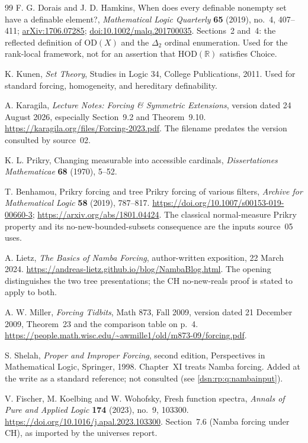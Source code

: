 \documentclass[11pt,a4paper]{article}
\numberwithin{equation}{section}
\theoremstyle{definition}
\theoremstyle{remark}
\newcommand{\OD}{\mathrm{OD}}
\newcommand{\HOD}{\mathrm{HOD}}
\newcommand{\R}{\mathbb R}
\begin{document}
\begin{thebibliography}{99}
F. G. Dorais and J. D. Hamkins,
When does every definable nonempty set have a definable element?,
\emph{Mathematical Logic Quarterly} \textbf{65} (2019), no.~4, 407--411;
\href{https://arxiv.org/abs/1706.07285}{arXiv:1706.07285};
\href{https://doi.org/10.1002/malq.201700035}{doi:10.1002/malq.201700035}.
Sections~2 and~4: the reflected definition of $\OD(X)$ and the $\Delta_2$
ordinal enumeration. Used for the rank-local framework, not for an assertion
that $\HOD(\R)$ satisfies Choice.

K. Kunen, \emph{Set Theory}, Studies in Logic 34, College Publications,
2011. Used for standard forcing, homogeneity, and hereditary definability.

A. Karagila, \emph{Lecture Notes: Forcing \& Symmetric Extensions}, version
dated 24 August 2026, especially Section~9.2 and Theorem~9.10.
\url{https://karagila.org/files/Forcing-2023.pdf}. The filename predates the
version consulted by source~02.

K. L. Prikry, Changing measurable into accessible cardinals,
\emph{Dissertationes Mathematicae} \textbf{68} (1970), 5--52.

T. Benhamou, Prikry forcing and tree Prikry forcing of various filters,
\emph{Archive for Mathematical Logic} \textbf{58} (2019), 787--817.
\url{https://doi.org/10.1007/s00153-019-00660-3};
\url{https://arxiv.org/abs/1801.04424}. The classical normal-measure Prikry
property and its no-new-bounded-subsets consequence are the inputs source~05
uses.

A. Lietz, \emph{The Basics of Namba Forcing}, author-written exposition,
22 March 2024. \url{https://andreas-lietz.github.io/blog/NambaBlog.html}.
The opening distinguishes the two tree presentations; the CH no-new-reals
proof is stated to apply to both.

A. W. Miller, \emph{Forcing Tidbits}, Math 873, Fall 2009, version dated
21 December 2009, Theorem~23 and the comparison table on p.~4.
\url{https://people.math.wisc.edu/~awmille1/old/m873-09/forcing.pdf}.

S. Shelah, \emph{Proper and Improper Forcing}, second edition, Perspectives in
Mathematical Logic, Springer, 1998. Chapter~XI treats Namba forcing. Added at
the write as a standard reference; not consulted (see
\cref{dsn:rp:q:nambainput}).

V. Fischer, M. Koelbing and W. Wohofsky, Fresh function spectra,
\emph{Annals of Pure and Applied Logic} \textbf{174} (2023), no.~9, 103300.
\url{https://doi.org/10.1016/j.apal.2023.103300}. Section~7.6 (Namba forcing
under CH), as imported by the universes report.


\end{thebibliography}
\end{document}
